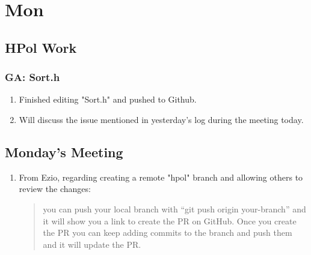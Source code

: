 \documentclass[12pt,letterpaper]{article}
\begin{document}
\section{Mon}
\subsection{HPol Work}
\subsubsection{GA: Sort.h}
\begin{enumerate}
  \item Finished editing "Sort.h" and pushed to Github.
  \item Will discuss the issue mentioned in yesterday's log during the meeting today.
\end{enumerate}

\subsection{Monday's Meeting}
\begin{enumerate}
  \item From Ezio, regarding creating a remote "hpol" branch and allowing others to 
    review the changes:
    \begin{quote}
    you can push your local branch with ``git push origin your-branch'' and it
    will show you a link to create the PR on GitHub. Once you create the PR you
    can keep adding commits to the branch and push them and it will update the PR.
    \end{quote}
\end{enumerate}
\end{document}
